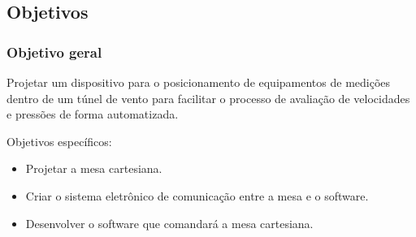 \subsection{Objetivos}

\begin{frame}
\frametitle{Objetivo geral}

Projetar um dispositivo para o posicionamento de equipamentos de medições dentro de um túnel de vento para facilitar o processo de avaliação de velocidades e pressões de forma automatizada.

Objetivos específicos:
\begin{itemize}
    \item Projetar a mesa cartesiana.
    \item Criar o sistema eletrônico de comunicação entre a mesa e o software.
    \item Desenvolver o software que comandará a mesa cartesiana.
\end{itemize}

\end{frame}
